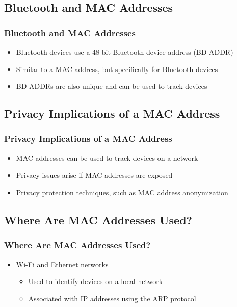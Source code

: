 \documentclass[
english,
svgnames,
notes=hide,
12pt]{beamer}
\begin{document}
\begin{frame}
  \section{Bluetooth and MAC Addresses}
  \frametitle{Bluetooth and MAC Addresses}
  \begin{itemize}
    \item Bluetooth devices use a 48-bit Bluetooth device address (BD ADDR) \pause
    \item Similar to a MAC address, but specifically for Bluetooth devices \pause
    \item BD ADDRs are also unique and can be used to track devices 
  \end{itemize}
\end{frame}

\begin{frame}
  \section{Privacy Implications of a MAC Address}
  \frametitle{Privacy Implications of a MAC Address}
  \begin{itemize}
    \item MAC addresses can be used to track devices on a network \pause
    \item Privacy issues arise if MAC addresses are exposed \pause
    \item Privacy protection techniques, such as MAC address anonymization 
  \end{itemize}
\end{frame}

\begin{frame}
  \section{Where Are MAC Addresses Used?}
  \frametitle{Where Are MAC Addresses Used?}
  \begin{itemize}
    \item Wi-Fi and Ethernet networks \pause
      \begin{itemize}
        \item Used to identify devices on a local network \pause
        \item Associated with IP addresses using the ARP protocol
      \end{itemize}
  \end{itemize}
\end{frame}
\end{document}
